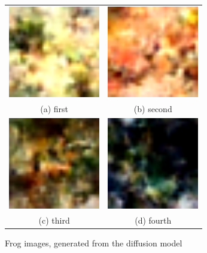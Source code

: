 \documentclass[conference]{IEEEtran}
\begin{document}
          \begin{figure}
            \begin{tabular}{cc}
              \includegraphics[width=40mm]{./images/generated-imgs-cosine/frog/0612.png} 
          &   \includegraphics[width=40mm]{./images/generated-imgs-cosine/frog/0613.png} 
          \\
            (a) first 
            & (b) second \\[6pt]
               \includegraphics[width=40mm]{./images/generated-imgs-cosine/frog/0614.png} 
            &  \includegraphics[width=40mm]{./images/generated-imgs-cosine/frog/0615.png} 
          \\
            (c) third & (d) fourth \\[6pt]
            \end{tabular}
            \caption{Frog images, generated from the diffusion model}
            \end{figure}
        
\end{document}
